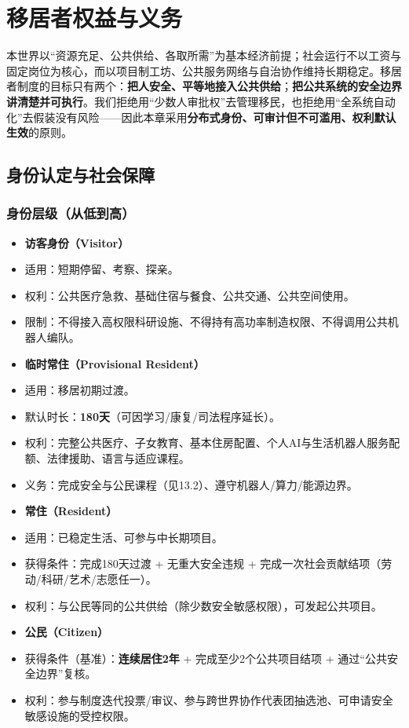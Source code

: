 \chapter{移居者权益与义务}\label{ux79fbux5c45ux8005ux6743ux76caux4e0eux4e49ux52a1}

本世界以``资源充足、公共供给、各取所需''为基本经济前提；社会运行不以工资与固定岗位为核心，而以项目制工坊、公共服务网络与自治协作维持长期稳定。移居者制度的目标只有两个：\textbf{把人安全、平等地接入公共供给}；\textbf{把公共系统的安全边界讲清楚并可执行}。我们拒绝用``少数人审批权''去管理移民，也拒绝用``全系统自动化''去假装没有风险------因此本章采用\textbf{分布式身份、可审计但不可滥用、权利默认生效}的原则。

\section{身份认定与社会保障}\label{ux8eabux4efdux8ba4ux5b9aux4e0eux793eux4f1aux4fddux969c}

\subsection{身份层级（从低到高）}\label{ux8eabux4efdux5c42ux7ea7ux4eceux4f4eux5230ux9ad8}

\begin{itemize}
\item
  \textbf{访客身份（Visitor）}
\item
  适用：短期停留、考察、探亲。
\item
  权利：公共医疗急救、基础住宿与餐食、公共交通、公共空间使用。
\item
  限制：不得接入高权限科研设施、不得持有高功率制造权限、不得调用公共机器人编队。
\item
  \textbf{临时常住（Provisional Resident）}
\item
  适用：移居初期过渡。
\item
  默认时长：\textbf{180天}（可因学习/康复/司法程序延长）。
\item
  权利：完整公共医疗、子女教育、基本住房配置、个人AI与生活机器人服务配额、法律援助、语言与适应课程。
\item
  义务：完成安全与公民课程（见13.2）、遵守机器人/算力/能源边界。
\item
  \textbf{常住（Resident）}
\item
  适用：已稳定生活、可参与中长期项目。
\item
  获得条件：完成180天过渡 + 无重大安全违规 + 完成一次社会贡献结项（劳动/科研/艺术/志愿任一）。
\item
  权利：与公民等同的公共供给（除少数安全敏感权限），可发起公共项目。
\item
  \textbf{公民（Citizen）}
\item
  获得条件（基准）：\textbf{连续居住2年} + 完成至少2个公共项目结项 + 通过``公共安全边界''复核。
\item
  权利：参与制度迭代投票/审议、参与跨世界协作代表团抽选池、可申请安全敏感设施的受控权限。
\end{itemize}

